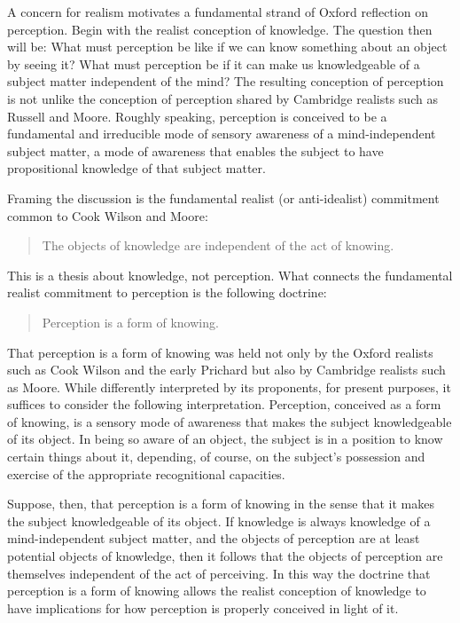 \documentclass[11pt]{article}
\title{\mytitle}
\author{\myauthor}
\begin{document}
\maketitle

\setlength{\parindent}{1em}


A concern for realism motivates a fundamental strand of Oxford reflection on perception. Begin with the realist conception of knowledge.  The question then will be: What must perception be like if we can know something about an object by seeing it? What must perception be if it can make us knowledgeable of a subject matter independent of the mind? The resulting conception of perception is not unlike the conception of perception shared by Cambridge realists such as Russell and Moore. Roughly speaking, perception is conceived to be a fundamental and irreducible mode of sensory awareness of a mind-independent subject matter, a mode of awareness that enables the subject to have propositional knowledge of that subject matter.

Framing the discussion is the fundamental realist (or anti-idealist) commitment common to Cook Wilson and Moore:
\begin{quote}
	The objects of knowledge are independent of the act of knowing.
\end{quote}
This is a thesis about knowledge, not perception. What connects the fundamental realist commitment to perception is the following doctrine:
\begin{quote}
	Perception is a form of knowing.  
\end{quote}
That perception is a form of knowing was held not only by the Oxford realists such as Cook Wilson and the early Prichard but also by Cambridge realists such as Moore. While differently interpreted by its proponents, for present purposes, it suffices to consider the following interpretation. Perception, conceived as a form of knowing, is a sensory mode of awareness that makes the subject knowledgeable of its object. In being so aware of an object, the subject is in a position to know certain things about it, depending, of course, on the subject's possession and exercise of the appropriate recognitional capacities.

Suppose, then, that perception is a form of knowing in the sense that it makes the subject knowledgeable of its object. If knowledge is always knowledge of a mind-independent subject matter, and the objects of perception are at least potential objects of knowledge, then it follows that the objects of perception are themselves independent of the act of perceiving. In this way the doctrine that perception is a form of knowing allows the realist conception of knowledge to have implications for how perception is properly conceived in light of it.
\end{document}
